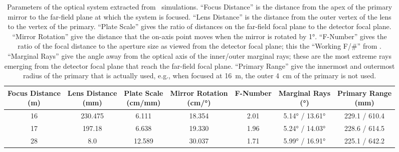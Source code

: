 \begin{table}
\centering
\caption[Parameters of the optical system extracted from \ZEMAX\ simulations]{
  Parameters of the optical system extracted from \ZEMAX\ simulations.
  ``Focus Distance'' is the distance from the apex of the primary mirror to the far-field plane at which the system is focused.
  ``Lens Distance'' is the distance from the outer vertex of the lens to the vertex of the primary.
  ``Plate Scale'' gives the ratio of distances on the far-field focal plane to the detector focal plane.
  ``Mirror Rotation'' give the distance that the on-axis point moves when the mirror is rotated by \ang{1}.
  ``F-Number'' gives the ratio of the focal distance to the aperture size as viewed from the detector focal plane; this the ``Working F/\#'' from \ZEMAX.
  ``Marginal Rays'' give the angle away from the optical axis of the inner/outer marginal rays; these are the most extreme rays emerging from the detector focal plane that reach the far-field focal plane.
  ``Primary Range'' give the innermost and outermost radius of the primary that is actually used, e.g., when focused at \SI{16}{\m}, the outer \SI{4}{\cm} of the primary is not used.
}
\label{tab:ch4-zemax-parms}
\begin{tabular}{ccccccc}
\toprule
  \specialcell{Focus Distance \\ (\si{\m})} &
  \specialcell{Lens Distance \\ (\si{\mm})} &
  \specialcell{Plate Scale \\ (\si{\cm}/\si{\mm})} &
  \specialcell{Mirror Rotation \\ (\si{\cm}/\si{\degree})} &
  \specialcell{F-Number  \\ } & 
  \specialcell{Marginal Rays \\ (\si{\degree})} &
  \specialcell{Primary Range \\ (\si{\mm})} \\
\midrule
16 & 230.475 &  6.111 & 18.354 & 2.01 &  \ang{5.14} / \ang{13.61} & 229.1 / 610.4 \\
17 & 197.18  &  6.638 & 19.330 & 1.96 &  \ang{5.24} / \ang{14.03} & 228.6 / 614.5 \\ 
28 &   8.0   & 12.589 & 30.037 & 1.71 &  \ang{5.99} / \ang{16.91} & 225.1 / 642.2 \\
\bottomrule
\end{tabular}
\end{table}

